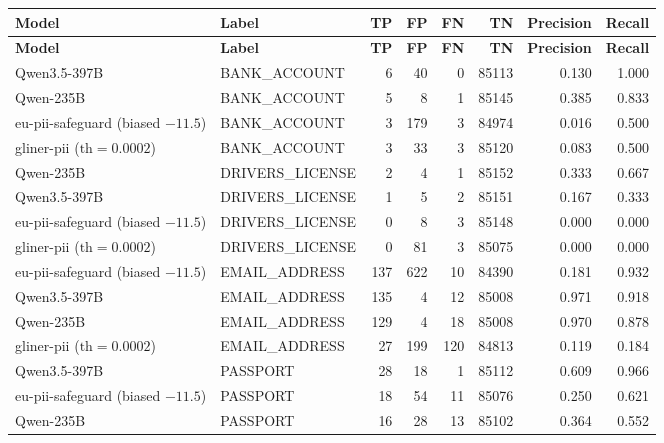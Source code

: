 \documentclass[11pt,a4paper]{article}
\begin{document}
{\centering
\scriptsize
\setlength{\LTcapwidth}{\linewidth}
\begin{longtable}{llrrrrrr}
\toprule
\textbf{Model} & \textbf{Label} & \textbf{TP} & \textbf{FP} & \textbf{FN} & \textbf{TN} & \textbf{Precision} & \textbf{Recall} \\
\midrule
\endfirsthead
\toprule
\textbf{Model} & \textbf{Label} & \textbf{TP} & \textbf{FP} & \textbf{FN} & \textbf{TN} & \textbf{Precision} & \textbf{Recall} \\
\midrule
\endhead
\bottomrule
\endfoot
Qwen3.5-397B                      & BANK\_ACCOUNT     &    6 &    40 &   0 & 85113 & 0.130 & 1.000 \\
Qwen-235B                         & BANK\_ACCOUNT     &    5 &     8 &   1 & 85145 & 0.385 & 0.833 \\
eu-pii-safeguard (biased $-11.5$) & BANK\_ACCOUNT     &    3 &   179 &   3 & 84974 & 0.016 & 0.500 \\
gliner-pii ($\text{th}=0.0002$)   & BANK\_ACCOUNT     &    3 &    33 &   3 & 85120 & 0.083 & 0.500 \\
\midrule
Qwen-235B                         & DRIVERS\_LICENSE  &    2 &     4 &   1 & 85152 & 0.333 & 0.667 \\
Qwen3.5-397B                      & DRIVERS\_LICENSE  &    1 &     5 &   2 & 85151 & 0.167 & 0.333 \\
eu-pii-safeguard (biased $-11.5$) & DRIVERS\_LICENSE  &    0 &     8 &   3 & 85148 & 0.000 & 0.000 \\
gliner-pii ($\text{th}=0.0002$)   & DRIVERS\_LICENSE  &    0 &    81 &   3 & 85075 & 0.000 & 0.000 \\
\midrule
eu-pii-safeguard (biased $-11.5$) & EMAIL\_ADDRESS    &  137 &   622 &  10 & 84390 & 0.181 & 0.932 \\
Qwen3.5-397B                      & EMAIL\_ADDRESS    &  135 &     4 &  12 & 85008 & 0.971 & 0.918 \\
Qwen-235B                         & EMAIL\_ADDRESS    &  129 &     4 &  18 & 85008 & 0.970 & 0.878 \\
gliner-pii ($\text{th}=0.0002$)   & EMAIL\_ADDRESS    &   27 &   199 & 120 & 84813 & 0.119 & 0.184 \\
\midrule
Qwen3.5-397B                      & PASSPORT          &   28 &    18 &   1 & 85112 & 0.609 & 0.966 \\
eu-pii-safeguard (biased $-11.5$) & PASSPORT          &   18 &    54 &  11 & 85076 & 0.250 & 0.621 \\
Qwen-235B                         & PASSPORT          &   16 &    28 &  13 & 85102 & 0.364 & 0.552 \\

\end{longtable}}
\end{document}
